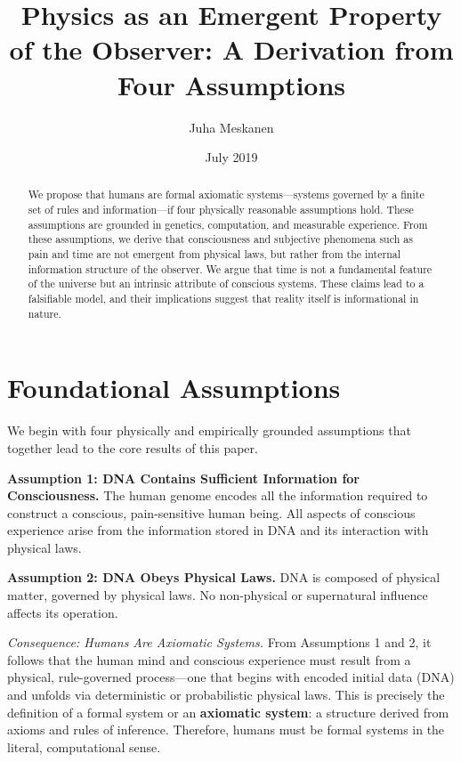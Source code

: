 \documentclass[11pt]{article}
\title{Physics as an Emergent Property of the Observer: A Derivation from Four Assumptions}
\author{Juha Meskanen}
\date{July 2019}
\begin{document}
\maketitle

\begin{abstract}
  We propose that humans are formal axiomatic systems—systems governed by a finite set of rules and information—if four physically reasonable assumptions hold. These assumptions are grounded in genetics, computation, and measurable experience. From these assumptions, we derive that consciousness and subjective phenomena such as pain and time are not emergent from physical laws, but rather from the internal information structure of the observer. We argue that time is not a fundamental feature of the universe but an intrinsic attribute of conscious systems. These claims lead to a falsifiable model, and their implications suggest that reality itself is informational in nature.
\end{abstract}

\section{Foundational Assumptions}

We begin with four physically and empirically grounded assumptions that together lead to the core results of this paper.

\textbf{Assumption 1: DNA Contains Sufficient Information for Consciousness.}
The human genome encodes all the information required to construct a conscious, pain-sensitive human being. All aspects of conscious experience arise from the information stored in DNA and its interaction with physical laws.

\textbf{Assumption 2: DNA Obeys Physical Laws.}
DNA is composed of physical matter, governed by  physical laws. No non-physical or supernatural influence affects its operation.

\vspace{0.5em}
\textit{Consequence: Humans Are Axiomatic Systems.}
From Assumptions 1 and 2, it follows that the human mind and conscious experience must result from a physical, rule-governed process—one that begins with encoded initial data (DNA) and unfolds via deterministic or probabilistic physical laws. This is precisely the definition of a formal system or an \textbf{axiomatic system}: a structure derived from axioms and rules of inference. Therefore, humans must be formal systems in the literal, computational sense.
\end{document}
